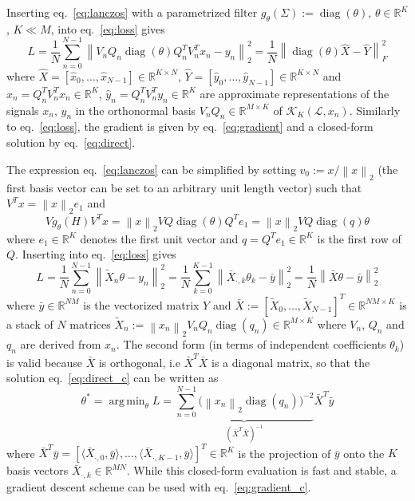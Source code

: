 \documentclass{article}
\DeclareMathOperator*{\diag}{diag}
\DeclareMathOperator*{\argmin}{arg\,min}
\renewcommand{\L}{\mathcal{L}}
\newcommand{\R}{\mathbb{R}}
\newcommand{\norm}[1]{\left\| #1 \right\|}
\begin{document}
Inserting eq.~\ref{eq:lanczos} with a parametrized filter
\(g_\theta(\Sigma) := \diag(\theta)\), \(\theta \in \R^K\), \(K \ll M\),
into eq.~\ref{eq:loss} gives \[ L = \frac{1}{N} \sum_{n=0}^{N-1}
\norm{V_n Q_n \diag(\theta) Q_n^T V_n^T x_n - y_n}_2^2 =
\frac{1}{N} \norm{\diag(\theta) \hat{X} - \hat{Y}}_F^2 \] where
\(\hat{X} = [\hat{x}_0, \ldots, \hat{x}_{N-1}] \in \R^{K \times N}\),
\(\hat{Y} = [\hat{y}_0, \ldots, \hat{y}_{N-1}] \in \R^{K \times N}\) and
\(\hat{x}_n = Q_n^T V_n^T x_n \in \R^K\),
\(\hat{y}_n = Q_n^T V_n^T y_n \in \R^K\) are approximate representations
of the signals \(x_n\), \(y_n\) in the orthonormal basis
\(V_n Q_n \in \R^{M \times K}\) of \(\mathcal{K}_K(\L,x_n)\). Similarly
to eq.~\ref{eq:loss}, the gradient is given by eq.~\ref{eq:gradient} and
a closed-form solution by eq.~\ref{eq:direct}.

The expression eq.~\ref{eq:lanczos} can be simplified by setting
\(v_0 := x / \norm{x}_2\) (the first basis vector can be set to an
arbitrary unit length vector) such that \(V^T x = \norm{x}_2 e_1\) and
\[ V g_\theta(H) V^T x =
\norm{x}_2 V Q \diag(\theta) Q^T e_1 =
\norm{x}_2 V Q \diag(q) \theta \] where \(e_1 \in \R^K\) denotes the
first unit vector and \(q = Q^T e_1 \in \R^K\) is the first row of
\(Q\). Inserting into eq.~\ref{eq:loss} gives \[ L =
\frac{1}{N} \sum_{n=0}^{N-1} \norm{\tilde{X}_n \theta - y_n}_2^2 =
\frac{1}{N} \sum_{k=0}^{K-1} \norm{\bar{X}_{\cdot,k} \theta_k - \bar{y}}_2^2 =
\frac{1}{N} \norm{\bar{X} \theta - \bar{y} }_2^2 \] where
\(\bar{y} \in \R^{NM}\) is the vectorized matrix \(Y\) and
\(\bar{X} := [\tilde{X}_0, \ldots, \tilde{X}_{N-1}]^T \in \R^{NM \times K}\)
is a stack of \(N\) matrices
\(\tilde{X}_n := \norm{x_n}_2 V_n Q_n \diag(q_n) \in \R^{M \times K}\)
where \(V_n\), \(Q_n\) and \(q_n\) are derived from \(x_n\). The second
form (in terms of independent coefficients \(\theta_k\)) is valid
because \(\bar{X}\) is orthogonal, i.e \(\bar{X}^T \bar{X}\) is a
diagonal matrix, so that the solution eq.~\ref{eq:direct_c} can be
written as \begin{equation} \theta^* = \argmin_\theta L =
\underbrace{\sum_{n=0}^{N-1} \Big( \norm{x_n}_2 \diag(q_n) \Big)^{-2}}
_{(\bar{X}^T\bar{X})^{-1}} \bar{X}^T \bar{y} \label{eq:direct_l}\end{equation}
where
\(\bar{X}^T \bar{y} = [\langle \bar{X}_{\cdot,0}, \bar{y} \rangle, \ldots, \langle \bar{X}_{\cdot,K-1}, \bar{y} \rangle]^T \in \R^K\)
is the projection of \(\bar{y}\) onto the \(K\) basis vectors
\(\bar{X}_{\cdot,k} \in \R^{MN}\). While this closed-form evaluation is
fast and stable, a gradient descent scheme can be used with
eq.~\ref{eq:gradient_c}.
\end{document}
